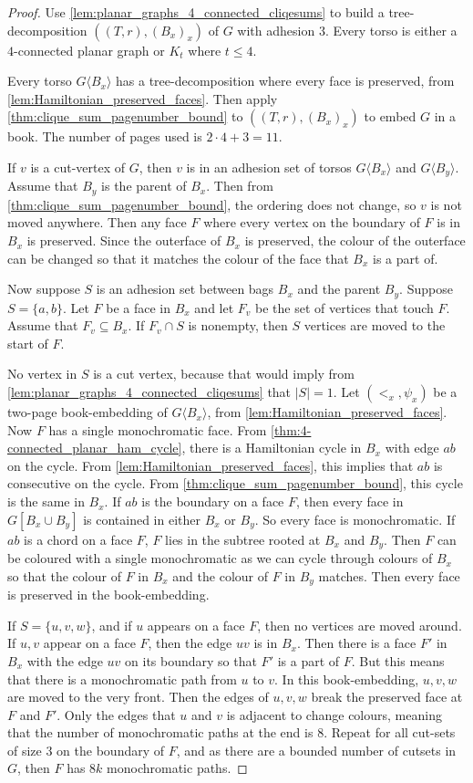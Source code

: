 \begin{proof}
	Use \cref{lem:planar_graphs_4_connected_cliqesums} to build a tree-decomposition $((T,r), (B_x)_x)$ of $G$ with adhesion $3$. Every torso is either a $4$-connected planar graph or $K_t$ where $t \leq 4$.
	
	Every torso $G \langle B_x \rangle$ has a tree-decomposition where every face is preserved, from \cref{lem:Hamiltonian_preserved_faces}. Then apply \cref{thm:clique_sum_pagenumber_bound} to $((T,r), (B_x)_x)$ to embed $G$ in a book. The number of pages used is $2 \cdot 4 + 3 = 11$. 

	If $v$ is a cut-vertex of $G$, then $v$ is in an adhesion set of torsos $G \langle B_x \rangle$ and $G \langle B_y \rangle$. Assume that $B_y$ is the parent of $B_x$. Then from \cref{thm:clique_sum_pagenumber_bound}, the ordering does not change, so $v$ is not moved anywhere. Then any face $F$ where every vertex on the boundary of $F$ is in $B_x$ is preserved. Since the outerface of $B_x$ is preserved, the colour of the outerface can be changed so that it matches the colour of the face that $B_x$ is a part of. 

	Now suppose $S$ is an adhesion set between bags $B_x$ and the parent $B_y$. Suppose $ S = \{a,b\}$. Let $F$ be a face in $B_x$ and let $F_v$ be the set of vertices that touch $F$. Assume that $F_v \subseteq B_x$. If $F_v \cap S$ is nonempty, then $S$ vertices are moved to the start of $F$. 
	
	No vertex in $S$ is a cut vertex, because that would imply from \cref{lem:planar_graphs_4_connected_cliqesums} that $|S| = 1$. Let $(<_x, \psi_x)$ be a two-page book-embedding of $G \langle B_x \rangle$, from \cref{lem:Hamiltonian_preserved_faces}. Now $F$ has a single monochromatic face.
	From \cref{thm:4-connected_planar_ham_cycle}, there is a Hamiltonian cycle in $B_x$ with edge $ab$ on the cycle. From \cref{lem:Hamiltonian_preserved_faces}, this implies that $ab$ is consecutive on the cycle. From \cref{thm:clique_sum_pagenumber_bound}, this cycle is the same in $B_x$. If $ab$ is the boundary on a face $F$, then every face in $G[B_x \cup B_y]$ is contained in either $B_x$ or $B_y$. So every face is monochromatic. If $ab$ is a chord on a face $F$, $F$ lies in the subtree rooted at $B_x$ and $B_y$. Then $F$ can be coloured with a single monochromatic as we can cycle through colours of $B_x$ so that the colour of $F$ in $B_x$ and the colour of $F$ in $B_y$ matches. Then every face is preserved in the book-embedding. 

	If $S = \{u,v,w\}$, and if $u$ appears on a face $F$, then no vertices are moved around. If $u,v$ appear on a face $F$, then the edge $uv$ is in $B_x$. Then there is a face $F'$ in $B_x$ with the edge $uv$ on its boundary so that $F'$ is a part of $F$. But this means that there is a monochromatic path from $u$ to $v$. In this book-embedding, $u,v,w$ are moved to the very front. Then the edges of $u,v,w$ break the preserved face at $F$ and $F'$. Only the edges that $u$ and $v$ is adjacent to change colours, meaning that the number of monochromatic paths at the end is $8$. Repeat for all cut-sets of size $3$ on the boundary of $F$, and as there are a bounded number of cutsets in $G$, then $F$ has $8k$ monochromatic paths.


\end{proof}

